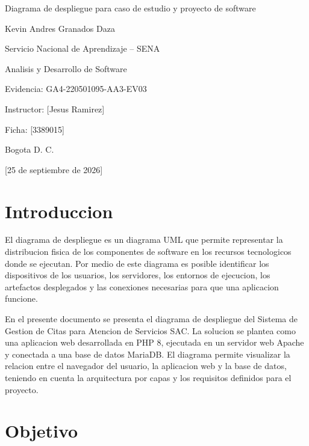 \documentclass[12pt,letterpaper]{article}
\newcommand{\institucion}{Servicio Nacional de Aprendizaje -- SENA}
\newcommand{\programa}{Analisis y Desarrollo de Software}
\newcommand{\tituloTrabajo}{Diagrama de despliegue para caso de estudio y proyecto de software}
\newcommand{\codigoEvidencia}{GA4-220501095-AA3-EV03}
\newcommand{\aprendiz}{Kevin Andres Granados Daza}
\newcommand{\instructor}{[Jesus Ramirez]}
\newcommand{\ficha}{[3389015]}
\newcommand{\ciudad}{Bogota D. C.}
\newcommand{\fechaEntrega}{[25 de septiembre de 2026]}
\begin{document}
\begin{titlepage}
    \centering
    \vspace*{2.5cm}
    {\Large \tituloTrabajo\par}
    \vfill
    {\large \aprendiz\par}
    \vspace{1.5cm}
    {\large \institucion\par}
    {\large \programa\par}
    \vspace{1cm}
    {\large Evidencia: \codigoEvidencia\par}
    \vspace{1cm}
    {\large Instructor: \instructor\par}
    {\large Ficha: \ficha\par}
    \vfill
    {\large \ciudad\par}
    {\large \fechaEntrega\par}
\end{titlepage}

\section{Introduccion}

El diagrama de despliegue es un diagrama UML que permite representar la distribucion fisica de los componentes de software en los recursos tecnologicos donde se ejecutan. Por medio de este diagrama es posible identificar los dispositivos de los usuarios, los servidores, los entornos de ejecucion, los artefactos desplegados y las conexiones necesarias para que una aplicacion funcione.

En el presente documento se presenta el diagrama de despliegue del Sistema de Gestion de Citas para Atencion de Servicios SAC. La solucion se plantea como una aplicacion web desarrollada en PHP 8, ejecutada en un servidor web Apache y conectada a una base de datos MariaDB. El diagrama permite visualizar la relacion entre el navegador del usuario, la aplicacion web y la base de datos, teniendo en cuenta la arquitectura por capas y los requisitos definidos para el proyecto.

\section{Objetivo}
\end{document}
